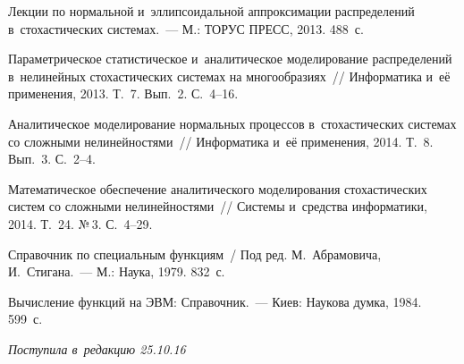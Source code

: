 \begin{multicols}{2}
{{\begin{thebibliography}{9}
Лекции по нормальной и~эллипсоидальной аппроксимации распределений 
в~стохастических системах.~--- М.: ТОРУС ПРЕСС, 2013. 488~с.

Параметрическое статистическое и~аналитическое моделирование распределений в~нелинейных 
стохастических системах на многообразиях~// Информатика и~её применения, 2013. 
Т.~7. Вып.~2. С.~4--16.

Аналитическое моделирование нормальных процессов в~стохастических системах со 
сложными нелинейностями~// Информатика и~её применения, 2014. Т.~8. Вып.~3. С.~2--4.

Математическое обеспечение аналитического моделирования стохастических систем со 
сложными нелинейностями~// Системы и~средства информатики, 2014. Т.~24. №\,3. С.~4--29.


Справочник по специальным функциям~/ Под ред. М.~Абрамовича, И.~Стигана.~--- 
М.: Наука, 1979. 832~с.

Вычисление функций на ЭВМ: Справочник.~--- Киев: Наукова думка, 1984. 599~с.
 \end{thebibliography}

 }
 }

\end{multicols}

\vspace*{-3pt}

\hfill{\small\textit{Поступила в~редакцию 25.10.16}}


\newpage

\vspace*{-24pt}






\def\tit{ANALYTICAL MODELING OF~WIDE BAND~PROCESSES 
IN~STOCHASTIC~SYSTEMS WITH~UNSOLVED DERIVATIVES}

\def\titkol{Analytical modeling of~processes in~stochastic
systems with~unsolved derivatives}

